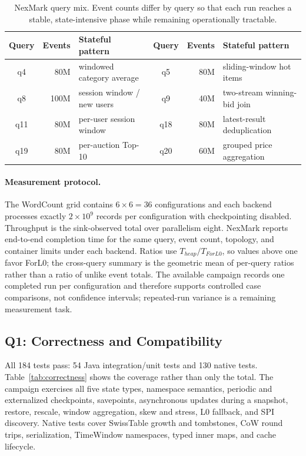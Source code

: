 \documentclass[sigconf]{acmart}
\newcommand{\forlzero}{ForL0\xspace}
\newcommand{\system}{\forlzero}
\begin{document}
\begin{table}[t]
\caption{NexMark query mix. Event counts differ by query so that each run reaches a stable, state-intensive phase while remaining operationally tractable.}
\label{tab:nexmark-workloads}
\centering
\small
\begin{tabular}{c r l@{\qquad}c r l}
\toprule
Query & Events & Stateful pattern & Query & Events & Stateful pattern \\
\midrule
q4  & 80M  & windowed category average & q5  & 80M  & sliding-window hot items \\
q8  & 100M & session window / new users & q9  & 40M  & two-stream winning-bid join \\
q11 & 80M  & per-user session window & q18 & 80M  & latest-result deduplication \\
q19 & 80M  & per-auction Top-10 & q20 & 60M  & grouped price aggregation \\
\bottomrule
\end{tabular}
\end{table}

\paragraph{Measurement protocol.}
The WordCount grid contains $6\times6=36$ configurations and each backend processes exactly $2\times10^9$ records per configuration with checkpointing disabled. Throughput is the sink-observed total over parallelism eight. NexMark reports end-to-end completion time for the same query, event count, topology, and container limits under each backend. Ratios use $T_{heap}/T_{\system}$, so values above one favor \system; the cross-query summary is the geometric mean of per-query ratios rather than a ratio of unlike event totals. The available campaign records one completed run per configuration and therefore supports controlled case comparisons, not confidence intervals; repeated-run variance is a remaining measurement task.

\subsection{Q1: Correctness and Compatibility}

All 184 tests pass: 54 Java integration/unit tests and 130 native tests. Table~\ref{tab:correctness} shows the coverage rather than only the total. The campaign exercises all five state types, namespace semantics, periodic and externalized checkpoints, savepoints, asynchronous updates during a snapshot, restore, rescale, window aggregation, skew and stress, L0 fallback, and SPI discovery. Native tests cover SwissTable growth and tombstones, CoW round trips, serialization, TimeWindow namespaces, typed inner maps, and cache lifecycle.
\end{document}

